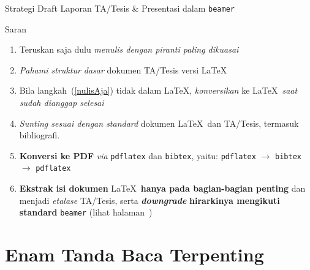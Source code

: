 \documentclass[11pt,            %
               aspectratio=169, %
               xcolor=svgnames,
               t                %
               ]{beamer}
\begin{document}
\begin{frame}{Strategi Draft Laporan TA/Tesis \& Presentasi dalam \texttt{beamer}}
\begin{block}{Saran}
\begin{enumerate}
\item Teruskan saja dulu \textit{menulis dengan piranti paling dikuasai}\label{nulisAja}
\item \textit{Pahami struktur dasar} dokumen TA/Tesis versi \LaTeX
\item Bila langkah~(\ref{nulisAja}) tidak dalam \LaTeX, \textit{konversikan} ke \LaTeX\ \textit{saat
      sudah dianggap selesai}
\item \textit{Sunting sesuai dengan standard} dokumen \LaTeX\ dan TA/Tesis, termasuk bibliografi.
\item \textbf{Konversi ke PDF} \textit{via} \texttt{pdflatex} dan \texttt{bibtex}, yaitu:
      \texttt{pdflatex} $ \rightarrow $ \texttt{bibtex} $ \rightarrow $ \texttt{pdflatex}
\item \textbf{Ekstrak isi dokumen} \LaTeX\ \textbf{hanya pada bagian-bagian penting} dan menjadi \textit{etalase} TA/Tesis, serta \textit{\bfseries downgrade} \textbf{hirarkinya mengikuti standard }\texttt{beamer} (lihat halaman~\pageref{hirarki})
\end{enumerate}
\end{block}
\end{frame}

\begin{frame}[plain]
    \vfill
    \vfill
\end{frame}

\section{Enam Tanda Baca Terpenting}
\end{document}
